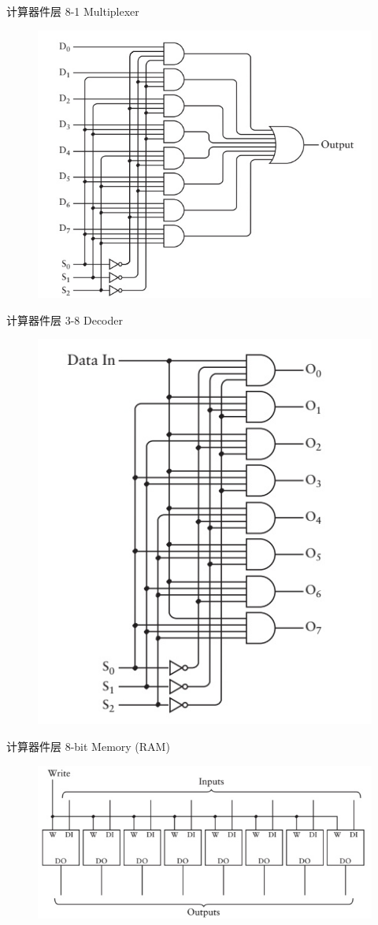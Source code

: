 \documentclass{myslide}
\begin{document}
\begin{frame}{计算器件层}
8-1 Multiplexer
\begin{figure}
\centering
\includegraphics[width=0.6\linewidth]{fig/Lecture2/8-1mux.jpg}
\end{figure}
\end{frame}

\begin{frame}{计算器件层}
3-8 Decoder
\begin{figure}
\centering
\includegraphics[width=0.5\linewidth]{fig/Lecture2/3-8decoder.jpg}
\end{figure}
\end{frame}

\begin{frame}{计算器件层}
8-bit Memory (RAM)
\begin{figure}
\centering
\includegraphics[width=0.8\linewidth]{fig/Lecture2/8bit-latch.jpg}
\end{figure}
\end{frame}
\end{document}
